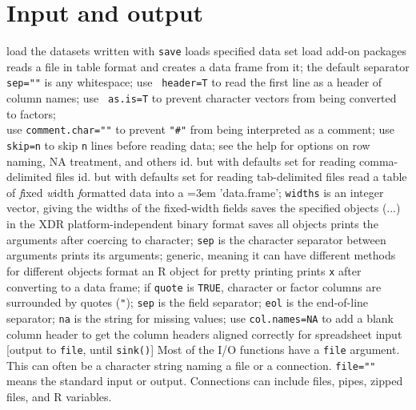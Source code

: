 {\section{Input and output}{}
	{load the datasets written with {\tt save}}
	{loads specified data set}
	{load add-on packages}
	{reads a file in table format and creates a data frame
    from it; the default separator {\tt sep=""} is any whitespace; use {\tt
        header=T} to read the first line as a header of column names; use {\tt
        as.is=T} to prevent character vectors from being converted to factors;\\
    use {\tt comment.char=""} to prevent {\tt "\#"} from being interpreted as a
    comment; use {\tt skip=n} to skip {\tt n} lines before reading data; see
    the help for options on row naming, NA treatment, and others}
	{id. but with defaults set for reading comma-delimited files}
	{id. but with defaults set for reading tab-delimited files}
	{
    read a table of {\it f}ixed {\it w}idth {\it f}ormatted data into a
    \emergencystretch=3em 'data.frame'; {\tt widths} is an integer vector,
    giving the widths of the fixed-width fields}
	{saves the specified objects (...) in the XDR
    platform-independent binary format}
	{saves all objects}
	{prints the arguments after
    coercing to character; {\tt sep} is the character separator between
    arguments}
	{prints its arguments; generic, meaning it can
    have different methods for different objects}
	{format an R object for pretty printing}
	{prints {\tt x} after converting to a data frame; if {\tt quote} is {\tt TRUE}, character or factor columns are surrounded by quotes
    ({\tt "}); {\tt sep} is the field separator; {\tt eol} is the
    end-of-line separator; {\tt na} is the string for missing values;
    use {\tt col.names=NA} to add a blank column header to get the
    column headers aligned correctly for spreadsheet input}
	{[output to {\tt file}, until {\tt sink()}] Most
    of the I/O functions have a {\tt file} argument. This can often be a
    character string naming a file or a connection.  {\tt file=""} means
    the standard input or output. Connections can include files, pipes,
    zipped files, and R variables.}

}
